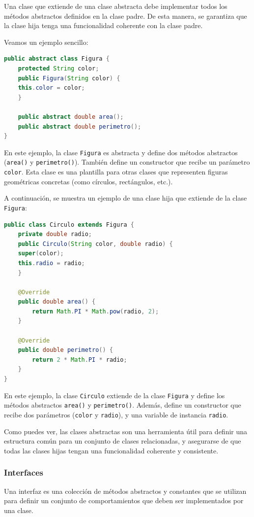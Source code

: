 \documentclass[executivepaper]{article}
\begin{document}
Una clase que extiende de una clase abstracta debe implementar todos los métodos abstractos definidos en la clase padre. De esta manera, se garantiza que la clase hija tenga una funcionalidad coherente con la clase padre.

Veamos un ejemplo sencillo:

\begin{lstlisting}[language=Java]
public abstract class Figura {
    protected String color;
    public Figura(String color) {
    this.color = color;
    }

    public abstract double area();
    public abstract double perimetro();
}
\end{lstlisting}
En este ejemplo, la clase \texttt{Figura} es abstracta y define dos métodos abstractos (\texttt{area()} y \texttt{perimetro()}). También define un constructor que recibe un parámetro \texttt{color}. Esta clase es una plantilla para otras clases que representen figuras geométricas concretas (como círculos, rectángulos, etc.).

A continuación, se muestra un ejemplo de una clase hija que extiende de la clase \texttt{Figura}:
\begin{lstlisting}[language=Java]
    public class Circulo extends Figura {
    private double radio;
    public Circulo(String color, double radio) {
    super(color);
    this.radio = radio;
    }

    @Override
    public double area() {
        return Math.PI * Math.pow(radio, 2);
    }

    @Override
    public double perimetro() {
        return 2 * Math.PI * radio;
    }
}
\end{lstlisting}    
En este ejemplo, la clase \texttt{Circulo} extiende de la clase \texttt{Figura} y define los métodos abstractos \texttt{area()} y \texttt{perimetro()}. Además, define un constructor que recibe dos parámetros (\texttt{color} y \texttt{radio}), y una variable de instancia \texttt{radio}.

Como puedes ver, las clases abstractas son una herramienta útil para definir una estructura común para un conjunto de clases relacionadas, y asegurarse de que todas las clases hijas tengan una funcionalidad coherente y consistente.

\subsubsection{Interfaces}
Una interfaz es una colección de métodos abstractos y constantes que se utilizan para definir un conjunto de comportamientos que deben ser implementados por una clase.
\end{document}

